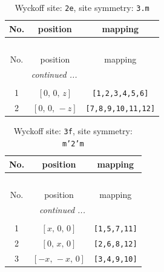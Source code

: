 \documentclass[fleqn,8pt]{jsarticle}
\begin{document}
\begin{longtable}{ccc}
\caption{Wyckoff site: {\tt 2e}, site symmetry: {\tt 3.m}}
 \\
 \hline \hline
No. & position & mapping \\ \hline \endfirsthead

\multicolumn{2}{l}{\tablename\ \thetable{}} \\
 \hline \hline
No. & position & mapping \\ \hline \endhead

 \hline \hline
\multicolumn{2}{r}{\footnotesize\it continued ...} \\ \endfoot

 \hline \hline
\multicolumn{2}{r}{} \\ \endlastfoot

1 & $\left[ 0,\, 0,\, z \right]$ & {\tt [1,2,3,4,5,6]} \\ \hline
2 & $\left[ 0,\, 0,\, - z \right]$ & {\tt [7,8,9,10,11,12]} \\
\end{longtable}
\renewcommand{\arraystretch}{1.2}
\begin{longtable}{ccc}
\caption{Wyckoff site: {\tt 3f}, site symmetry: {\tt m'2'm}}
 \\
 \hline \hline
No. & position & mapping \\ \hline \endfirsthead

\multicolumn{2}{l}{\tablename\ \thetable{}} \\
 \hline \hline
No. & position & mapping \\ \hline \endhead

 \hline \hline
\multicolumn{2}{r}{\footnotesize\it continued ...} \\ \endfoot

 \hline \hline
\multicolumn{2}{r}{} \\ \endlastfoot

1 & $\left[ x,\, 0,\, 0 \right]$ & {\tt [1,5,7,11]} \\ \hline
2 & $\left[ 0,\, x,\, 0 \right]$ & {\tt [2,6,8,12]} \\ \hline
3 & $\left[ - x,\, - x,\, 0 \right]$ & {\tt [3,4,9,10]} \\
\end{longtable}
\renewcommand{\arraystretch}{1.2}
\end{document}
